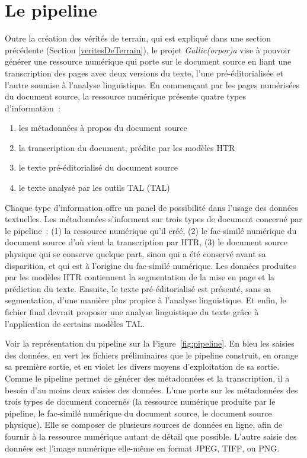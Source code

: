 \documentclass[class=article, crop=false]{standalone}
\begin{document}
\section{Le pipeline}
Outre la création des vérités de terrain, qui est expliqué dans une section précédente (Section \ref{veritesDeTerrain}), le projet \textit{Gallic(orpor)a} vise à pouvoir générer une ressource numérique qui porte sur le document source en liant une transcription des pages avec deux versions du texte, l'une pré-éditorialisée et l'autre soumise à l'analyse linguistique. En commençant par les pages numérisées du document source, la ressource numérique présente quatre types d'information~:
\begin{enumerate}
\item les métadonnées à propos du document source
\item la transcription du document, prédite par les modèles \acrshort{HTR}
\item le texte pré-éditorialisé du document source
\item le texte analysé par les outils \acrlong{TAL} (\acrshort{TAL})
\end{enumerate}


Chaque type d'information offre un panel de possibilité dans l'usage des données textuelles. Les métadonnées s'informent sur trois types de document concerné par le pipeline~: (1) la ressource numérique qu'il créé, (2) le fac-similé numérique du document source d'où vient la transcription par \acrshort{HTR}, (3) le document source physique qui se conserve quelque part, sinon qui a été conservé avant sa disparition, et qui est à l'origine du fac-similé numérique. Les données produites par les modèles \acrshort{HTR} contiennent la segmentation de la mise en page et la prédiction du texte. Ensuite, le texte pré-éditorialisé est présenté, sans sa segmentation, d'une manière plus propice à l'analyse linguistique. Et enfin, le fichier final devrait proposer une analyse linguistique du texte grâce à l'application de certains modèles \acrshort{TAL}.

Voir la représentation du pipeline sur la Figure~\ref{fig:pipeline}. En bleu les saisies des données, en vert les fichiers préliminaires que le pipeline construit, en orange sa première sortie, et en violet les divers moyens d'exploitation de sa sortie. Comme le pipeline permet de générer des métadonnées et la transcription, il a besoin d'au moins deux saisies des données. L'une porte sur les métadonnées des trois types de document concernés (la ressource numérique produite par le pipeline, le fac-similé numérique du document source, le document source physique). Elle se composer de plusieurs sources de données en ligne, afin de fournir à la ressource numérique autant de détail que possible. L'autre saisie des données est l'image numérique elle-même en format JPEG, TIFF, ou PNG.
\end{document}
